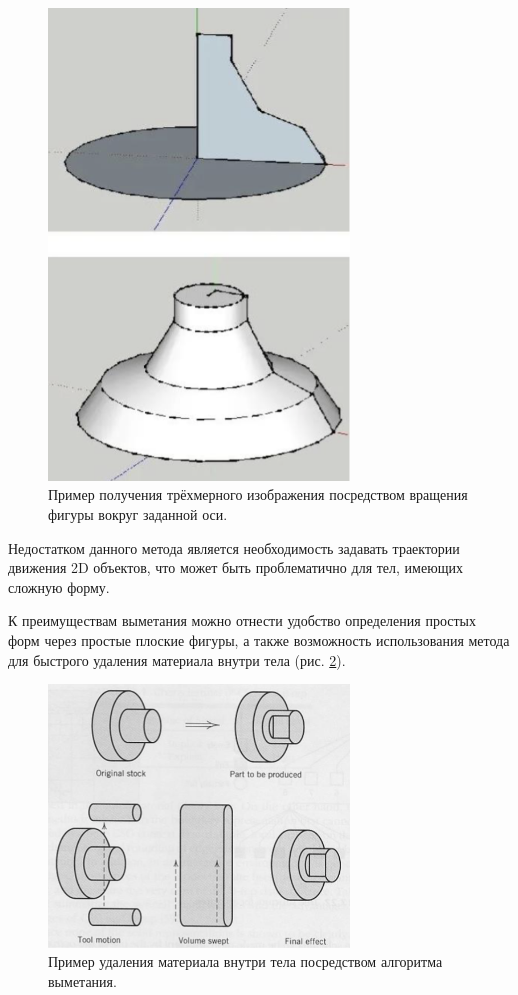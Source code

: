 \begin{figure}[h]
	\centering
	\includegraphics[width=80mm]{img/sweeping.png}
	\caption{Пример получения трёхмерного изображения посредством 
		вращения фигуры вокруг заданной оси.}
	\label{fig:sweeping}
\end{figure}

Недостатком данного метода является необходимость задавать траектории движения 2D объектов, что может быть проблематично для тел, имеющих сложную форму.

К преимуществам выметания можно отнести удобство определения простых форм через простые плоские фигуры, а также возможность использования метода для быстрого удаления материала внутри тела (рис. \ref{fig:deleting}). 
\newpage
\begin{figure}[h]
	\centering
	\includegraphics[width=80mm]{img/deleting.png}
	\caption{Пример удаления материала внутри тела посредством 
		алгоритма выметания.}
	\label{fig:deleting}
\end{figure}


